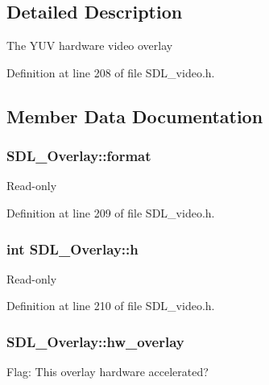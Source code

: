 \subsection{Detailed Description}
The Y\+U\+V hardware video overlay 

Definition at line 208 of file S\+D\+L\+\_\+video.\+h.



\subsection{Member Data Documentation}
\hypertarget{struct_s_d_l___overlay_a421f873d1ffc5530c1f9d4b49be75d4e}{}
\subsubsection[{format}]{ S\+D\+L\+\_\+\+Overlay\+::format}\label{struct_s_d_l___overlay_a421f873d1ffc5530c1f9d4b49be75d4e}
Read-\/only 

Definition at line 209 of file S\+D\+L\+\_\+video.\+h.

\hypertarget{struct_s_d_l___overlay_af1402a7a7cd8ba2816ddc7542c9d3e67}{}
\subsubsection[{h}]{\setlength{\rightskip}{0pt plus 5cm}int S\+D\+L\+\_\+\+Overlay\+::h}\label{struct_s_d_l___overlay_af1402a7a7cd8ba2816ddc7542c9d3e67}
Read-\/only 

Definition at line 210 of file S\+D\+L\+\_\+video.\+h.

\hypertarget{struct_s_d_l___overlay_a3c24f3b1805074deb9ce6ef5b14f70dc}{}
\subsubsection[{hw\+\_\+overlay}]{ S\+D\+L\+\_\+\+Overlay\+::hw\+\_\+overlay}\label{struct_s_d_l___overlay_a3c24f3b1805074deb9ce6ef5b14f70dc}
Flag\+: This overlay hardware accelerated? 

